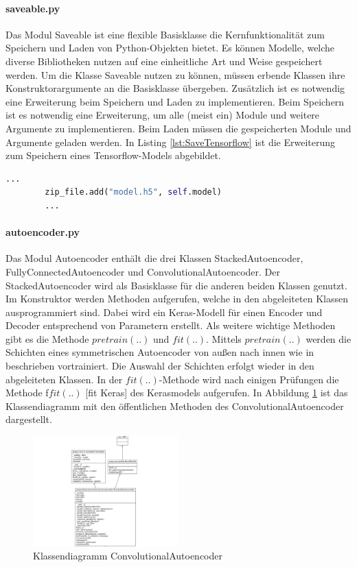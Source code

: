 	 \paragraph{saveable.py} Das Modul Saveable ist eine flexible Basisklasse die Kernfunktionalität zum Speichern und Laden von Python-Objekten bietet. Es können Modelle, welche diverse Bibliotheken nutzen auf eine einheitliche Art und Weise gespeichert werden. Um die Klasse Saveable nutzen zu können, müssen erbende Klassen ihre Konstruktorargumente an die Basisklasse übergeben. Zusätzlich ist es notwendig eine Erweiterung beim Speichern und Laden zu implementieren. Beim Speichern ist es notwendig eine Erweiterung, um alle (meist ein) Module und weitere Argumente zu implementieren. Beim Laden müssen die gespeicherten Module und Argumente geladen werden. In Listing \ref{lst:SaveTensorflow} ist die Erweiterung zum Speichern eines Tensorflow-Models abgebildet. 
	\begin{lstlisting}[language=python,caption=Erweiterung zum Speichern eines Tensorflow Models, label=lst:SaveTensorflow]
		...
		zip_file.add("model.h5", self.model)
		...
	\end{lstlisting}

	\paragraph{autoencoder.py} Das Modul Autoencoder enthält die drei Klassen StackedAutoencoder, FullyConnectedAutoencoder und ConvolutionalAutoencoder. Der StackedAutoencoder wird als Basisklasse für die anderen beiden Klassen genutzt. Im Konstruktor werden Methoden aufgerufen, welche in den abgeleiteten Klassen ausprogrammiert sind. Dabei wird ein Keras-Modell für einen Encoder und Decoder entsprechend von Parametern erstellt. Als weitere wichtige Methoden gibt es die Methode $pretrain(..)$ und $fit(..)$. Mittels $pretrain(..)$ werden die Schichten eines symmetrischen Autoencoder von außen nach innen wie in \cite{Bengio.2007} beschrieben vortrainiert. Die Auswahl der Schichten erfolgt wieder in den abgeleiteten Klassen.
	In der $fit(..)$-Methode wird nach einigen Prüfungen die Methode f$fit(..)$ 		[fit Keras] des Kerasmodels aufgerufen. In Abbildung \ref{img:KlassendiagrammConvolutionalAutoencoder} ist das Klassendiagramm mit den öffentlichen Methoden des ConvolutionalAutoencoder dargestellt. 
	\begin{figure}[h]
		\centering
		\includegraphics[width=0.5\textwidth, center]{bilder/Klassendiagramme/klassendiagramm_public_cae.png}
		\caption[Klassendiagramm ConvolutionalAutoencoder]{Klassendiagramm ConvolutionalAutoencoder}
		\label{img:KlassendiagrammConvolutionalAutoencoder}
	\end{figure}  
	
